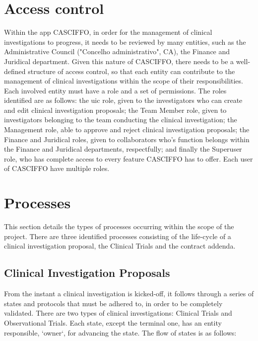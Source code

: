 \section{Access control}
\label{sec:access-control}
Within the app CASCIFFO, in order for the management of clinical investigations to progress, it needs to be reviewed by many entities, such as the Administrative Council ("Concelho administrativo", CA), the Finance and Juridical department.
Given this nature of CASCIFFO, there needs to be a well-defined structure of access control, so that each entity can contribute to the management of clinical investigations within the scope of their responsibilities. Each involved entity must have a role and a set of permissions.  
The roles identified are as follows: the \acrshort{uic} role, given to the investigators who can create and edit clinical investigation proposals; the Team Member role, given to investigators belonging to the team conducting the clinical investigation; the Management role, able to approve and reject clinical investigation proposals; the Finance and Juridical roles, given to collaborators who's function belongs within the Finance and Juridical departments, respectfully; and finally the Superuser role, who has complete access to every feature CASCIFFO has to offer. Each user of CASCIFFO have multiple roles.

\section{Processes} 
\label{sec:processes}
This section details the types of processes occurring within the scope of the project.  
There are three identified processes consisting of the life-cycle of a clinical investigation proposal, the Clinical Trials and the contract addenda. 



\subsection{Clinical Investigation Proposals}
\label{subsec:clinical-investigation-proposals}
From the instant a clinical investigation is kicked-off, it follows through a series of states and protocols that must be adhered to, in order to be completely validated.
There are two types of clinical investigations: Clinical Trials and Observational Trials.  
Each state, except the terminal one, has an entity responsible, `owner`, for advancing the state. 
The flow of states is as follows:  

